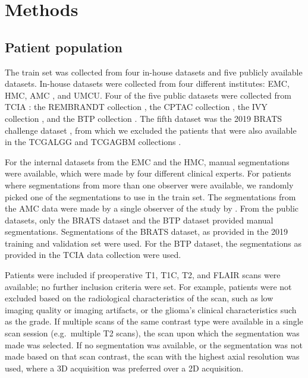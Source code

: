 \section{Methods}

\subsection{Patient population}

The train set was collected from four in-house datasets and five publicly available datasets.
In-house datasets were collected from four different institutes: \gls{EMC}, \gls{HMC}, \gls{AMC} \autocite{visser2019segmentation}, and \gls{UMCU}.
Four of the five public datasets were collected from \gls{TCIA} \autocite{clark2013cancer}:  the \gls{REMBRANDT} collection \autocite{scarpace2015radiology}, the \gls{CPTAC} collection \autocite{cptac2018radiology}, the \gls{IVY} collection \autocite{nameeta2016radiology, puchalski2018ivygap}, and the \gls{BTP} collection \autocite{schmainda2018radiology}.
The fifth dataset was the 2019 \gls{BRATS} challenge dataset \autocite{menze2015brats, bakas2017brats, bakas2018brats}, from which we excluded the patients that were also available in the \gls{TCGALGG} and \gls{TCGAGBM} collections \autocite{pedano2016radiology, scarpace2016radiology}.

For the internal datasets from the \gls{EMC} and the \gls{HMC}, manual segmentations were available, which were made by four different clinical experts.
For patients where segmentations from more than one observer were available, we randomly picked one of the segmentations to use in the train set.
The segmentations from the \gls{AMC} data were made by a single observer of the study by .
From the public datasets, only the \gls{BRATS} dataset and the \gls{BTP} dataset provided manual segmentations.
Segmentations of the \gls{BRATS} dataset, as provided in the 2019 training and validation set were used.
For the \gls{BTP} dataset, the segmentations as provided in the \gls{TCIA} data collection were used.

Patients were included if preoperative \gls{T1}, \gls{T1C}, \gls{T2}, and \gls{FLAIR} scans were available; no further inclusion criteria were set.
For example, patients were not excluded based on the radiological characteristics of the scan, such as low imaging quality or imaging artifacts, or the glioma's clinical characteristics such as the grade.
If multiple scans of the same contrast type were available in a single scan session (e.g.\ multiple \gls{T2} scans), the scan upon which the segmentation was made was selected.
If no segmentation was available, or the segmentation was not made based on that scan contrast, the scan with the highest axial resolution was used, where a 3D acquisition was preferred over a 2D acquisition.

